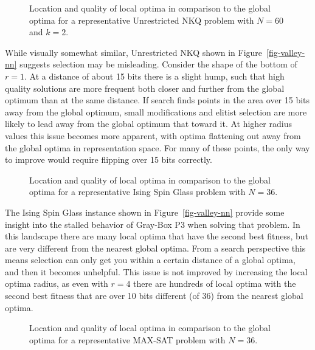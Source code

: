 \begin{figure*}
  \centering
  \caption{Location and quality of local optima in comparison to the global optima for a representative Unrestricted NKQ problem
           with $N=60$ and $k=2$.}
  \label{fig-valley-un}
\end{figure*}

While visually somewhat similar, Unrestricted NKQ shown in Figure~\ref{fig-valley-nn} suggests selection may be misleading.
Consider the shape of the bottom of $r=1$. At a distance of about 15 bits there is a slight hump, such that high quality solutions
are more frequent both closer and further from the global optimum than at the same distance.
If search finds points in the area over 15 bits away from the global optimum, small modifications and elitist selection
are more likely to lead away from the global optimum that toward it.
At higher radius values this issue becomes more apparent, with optima flattening out away
from the global optima in representation space. For many of these points, the only way to improve would require flipping over 15 bits
correctly.

\begin{figure*}
  \centering
  \caption{Location and quality of local optima in comparison to the global optima for a representative Ising Spin Glass problem
           with $N=36$.}
  \label{fig-valley-is}
\end{figure*}

The Ising Spin Glass instance shown in Figure~\ref{fig-valley-nn} provide some insight into the stalled behavior of Gray-Box
P3 when solving that problem. In this landscape there are many local optima that have the second best fitness, but are very
different from the nearest global optima. From a search perspective this means selection can only get you within a certain distance
of a global optima, and then it becomes unhelpful. This issue is not improved by increasing the local optima radius, as even with
$r=4$ there are hundreds of local optima with the second best fitness that are over 10 bits different (of 36) from
the nearest global optima.

\begin{figure*}
  \centering
  \caption{Location and quality of local optima in comparison to the global optima for a representative MAX-SAT problem
           with $N=36$.}
  \label{fig-valley-sat}
\end{figure*}

